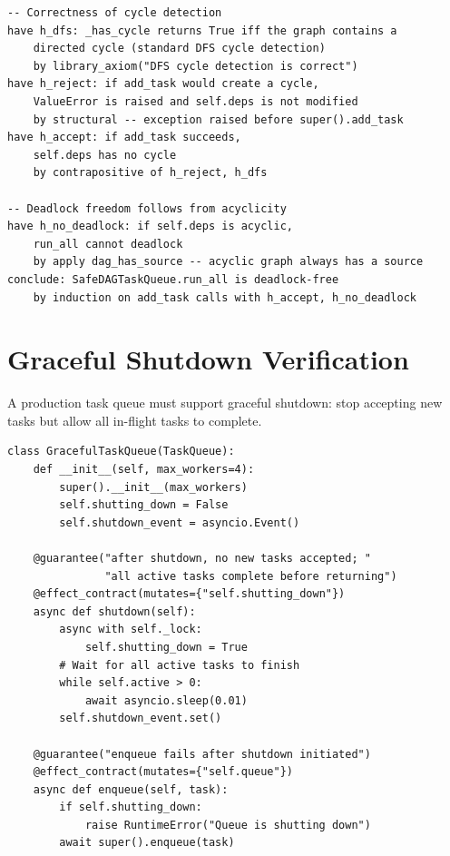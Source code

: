 \documentclass[11pt,a4paper]{report}
\theoremstyle{definition}
\theoremstyle{plain}
\begin{document}
\begin{lstlisting}[style=proof]
-- Correctness of cycle detection
have h_dfs: _has_cycle returns True iff the graph contains a
    directed cycle (standard DFS cycle detection)
    by library_axiom("DFS cycle detection is correct")
have h_reject: if add_task would create a cycle,
    ValueError is raised and self.deps is not modified
    by structural -- exception raised before super().add_task
have h_accept: if add_task succeeds,
    self.deps has no cycle
    by contrapositive of h_reject, h_dfs

-- Deadlock freedom follows from acyclicity
have h_no_deadlock: if self.deps is acyclic,
    run_all cannot deadlock
    by apply dag_has_source -- acyclic graph always has a source
conclude: SafeDAGTaskQueue.run_all is deadlock-free
    by induction on add_task calls with h_accept, h_no_deadlock
\end{lstlisting}

\section{Graceful Shutdown Verification}

A production task queue must support graceful shutdown: stop accepting
new tasks but allow all in-flight tasks to complete.

\begin{lstlisting}[style=synhopy]
class GracefulTaskQueue(TaskQueue):
    def __init__(self, max_workers=4):
        super().__init__(max_workers)
        self.shutting_down = False
        self.shutdown_event = asyncio.Event()

    @guarantee("after shutdown, no new tasks accepted; "
               "all active tasks complete before returning")
    @effect_contract(mutates={"self.shutting_down"})
    async def shutdown(self):
        async with self._lock:
            self.shutting_down = True
        # Wait for all active tasks to finish
        while self.active > 0:
            await asyncio.sleep(0.01)
        self.shutdown_event.set()

    @guarantee("enqueue fails after shutdown initiated")
    @effect_contract(mutates={"self.queue"})
    async def enqueue(self, task):
        if self.shutting_down:
            raise RuntimeError("Queue is shutting down")
        await super().enqueue(task)
\end{lstlisting}
\end{document}
